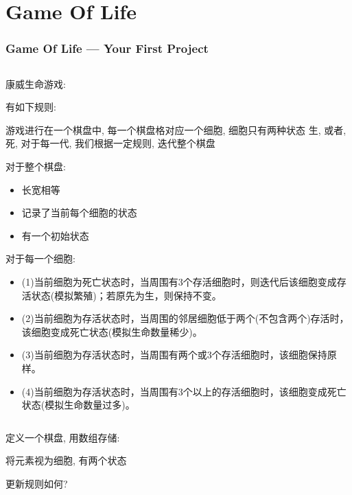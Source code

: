 \documentclass[en, 11pt, xcolor=dvipsnames]{beamer}
\begin{document}
\section{Game Of Life}
\begin{frame}[fragile]
	\frametitle{Game Of Life --- Your First Project}


	\begin{columns}[c]
		\begin{column}{0.98\textwidth}

			康威生命游戏:

			有如下规则:

			游戏进行在一个棋盘中, 每一个棋盘格对应一个细胞, 细胞只有两种状态
			生, 或者, 死, 对于每一代, 我们根据一定规则, 迭代整个棋盘

			对于整个棋盘:

			\begin{itemize}
				\item 长宽相等
				\item 记录了当前每个细胞的状态
				\item 有一个初始状态
			\end{itemize}

			对于每一个细胞:
			\begin{itemize}
				\item (1)当前细胞为死亡状态时，当周围有3个存活细胞时，则迭代后该细胞变成存活状态(模拟繁殖)；若原先为生，则保持不变。
				\item (2)当前细胞为存活状态时，当周围的邻居细胞低于两个(不包含两个)存活时，该细胞变成死亡状态(模拟生命数量稀少)。
				\item (3)当前细胞为存活状态时，当周围有两个或3个存活细胞时，该细胞保持原样。
				\item (4)当前细胞为存活状态时，当周围有3个以上的存活细胞时，该细胞变成死亡状态(模拟生命数量过多)。
			\end{itemize}


		\end{column}
	\end{columns}
\end{frame}

\begin{frame}[fragile]


	\begin{columns}[c]
		\begin{column}{0.98\textwidth}

			定义一个棋盘, 用数组存储:

			将元素视为细胞, 有两个状态

			更新规则如何?

		\end{column}
	\end{columns}
\end{frame}
\end{document}
